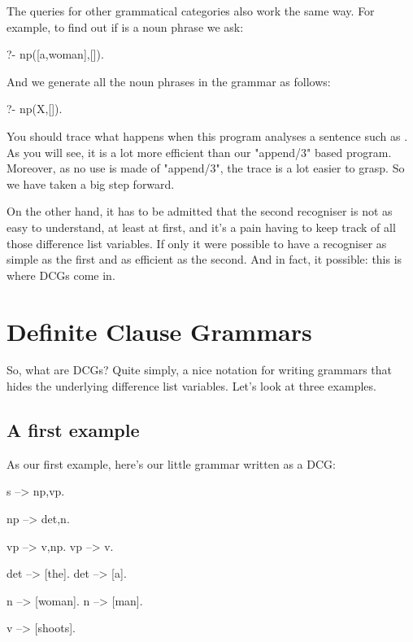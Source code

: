 The queries for other grammatical categories also work the same way.
For example, to find out if  is a noun phrase we ask:
\begin{LPNcodedisplay}
?- np([a,woman],[]).
\end{LPNcodedisplay}
And we generate all the noun phrases in the grammar as follows:
\begin{LPNcodedisplay}
?- np(X,[]).
\end{LPNcodedisplay}


You should trace what happens when this program analyses a sentence
such as .  As you will see, it is a lot
more efficient than our "append/3" based program.  Moreover, as no use
is made of "append/3", the trace is a lot easier to grasp.  So we have
taken a big step forward.

On the other hand, it has to be admitted that the second recogniser is
not as easy to understand, at least at first, and it's a pain having
to keep track of all those difference list variables.  If only it were
possible to have a recogniser as simple as the first and as efficient
as the second. And in fact, it  possible: this is  where
DCGs come in.



\section{Definite Clause Grammars}\label{SEC.L7.DCG}

So, what are DCGs?  Quite simply, a nice notation for writing
grammars that hides the underlying difference list variables.
Let's look at three examples.



\subsection*{A first example}\label{SUBSEC.L7.FIRSTEXAMPLE}

As our first example, here's our little
grammar written as a DCG:

\begin{LPNcodedisplay}
s --> np,vp.

np --> det,n.

vp --> v,np.
vp --> v.

det --> [the].
det --> [a].

n --> [woman].
n --> [man].

v --> [shoots].
\end{LPNcodedisplay}

